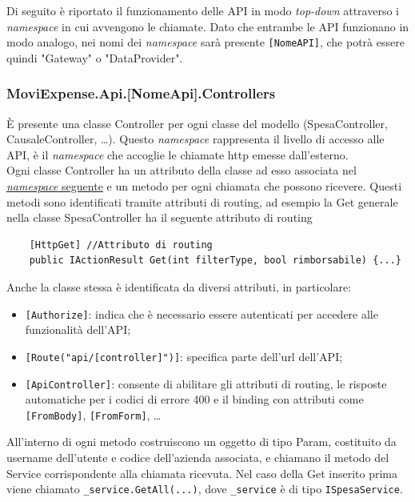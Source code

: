 \noindent Di seguito è riportato il funzionamento delle \gls{API} in modo \emph{top-down} attraverso i \emph{namespace} in cui avvengono le chiamate. Dato che entrambe le \gls{API} funzionano in modo analogo, nei nomi dei \emph{namespace} sarà presente \verb+[NomeAPI]+, che potrà essere quindi "Gateway" o "DataProvider".

\subsubsection{MoviExpense.Api.[NomeApi].Controllers}

È presente una classe Controller per ogni classe del modello (SpesaController, CausaleController, \dots). Questo \emph{namespace} rappresenta il livello di accesso alle API, è il \emph{namespace} che accoglie le chiamate http emesse dall'esterno.\\
Ogni classe Controller ha un attributo della classe ad esso associata nel \hyperref[cap:services]{\emph{namespace} seguente} e un metodo per ogni chiamata che possono ricevere. Questi metodi sono identificati tramite attributi di routing, ad esempio la Get generale nella classe SpesaController ha il seguente attributo di routing

\begin{verbatim}
    [HttpGet] //Attributo di routing
    public IActionResult Get(int filterType, bool rimborsabile) {...}
\end{verbatim}

\noindent Anche la classe stessa è identificata da diversi attributi, in particolare:
\begin{itemize}
    \item \verb+[Authorize]+: indica che è necessario essere autenticati per accedere alle funzionalità dell'API;
    \item \verb+[Route("api/[controller]")]+: specifica parte dell'url dell'API;
    \item \verb+[ApiController]+: consente di abilitare gli attributi di routing, le risposte automatiche per i codici di errore 400 e il binding con attributi come \verb+[FromBody]+, \verb+[FromForm]+, \dots
\end{itemize}
All'interno di ogni metodo costruiscono un oggetto di tipo Param, costituito da username dell'utente e codice dell'azienda associata, e chiamano il metodo del Service corrispondente alla chiamata ricevuta. Nel caso della Get inserito prima viene
chiamato \verb+_service.GetAll(...)+, dove \verb+_service+ è di tipo \verb+ISpesaService+.

